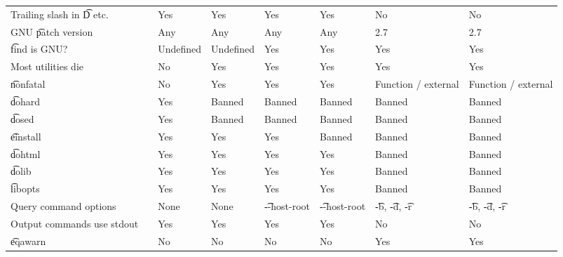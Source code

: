 \begin{landscape}
\begin{longtable}{llP{7.5em}P{7.5em}P{7.5em}P{7.5em}P{7.5em}P{7.5em}}
Trailing slash in \t{D} etc. &  &
    Yes & Yes & Yes & Yes & No & No \\

GNU \t{patch} version &  &
    Any & Any & Any & Any & 2.7 & 2.7 \\

\t{find} is GNU? &  &
    Undefined & Undefined & Yes & Yes & Yes & Yes \\

Most utilities die &  &
    No & Yes & Yes & Yes & Yes & Yes \\

\t{nonfatal} &  &
    No & Yes & Yes & Yes & Function / external & Function / external \\

\t{dohard} &  &
    Yes & Banned & Banned & Banned & Banned & Banned \\

\t{dosed} &  &
    Yes & Banned & Banned & Banned & Banned & Banned \\

\t{einstall} &  &
    Yes & Yes & Yes & Banned & Banned & Banned \\

\t{dohtml} &  &
    Yes & Yes & Yes & Yes & Banned & Banned \\

\t{dolib} &  &
    Yes & Yes & Yes & Yes & Banned & Banned \\

\t{libopts} &  &
    Yes & Yes & Yes & Yes & Banned & Banned \\

Query command options &  &
    None & None & \t{-{}-host-root} & \t{-{}-host-root} & \t{-b}, \t{-d}, \t{-r} &
    \t{-b}, \t{-d}, \t{-r} \\

Output commands use stdout &  &
    Yes & Yes & Yes & Yes & No & No \\

\t{eqawarn} &  &
    No & No & No & No & Yes & Yes \\


\end{longtable}
\end{landscape}
